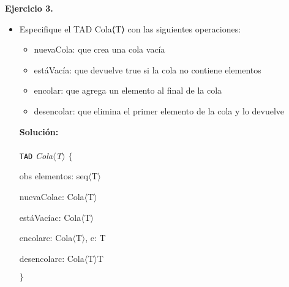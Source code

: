 \documentclass{article}
\newenvironment{tad}[1]{
	\paragraph{} \vspace*{-4mm}
	\newcommand{\obs}[2]{\texttt{obs} ##1 : ##2}

	\vspace{1ex}
	\texttt{TAD} \textit{#1} $\{$
	\par
	\tocarEspacios
}
{

\hspace{2.5mm} $\}$
\vspace{2ex}
}
\begin{document}
\textbf{Ejercicio 3.} 
\begin{itemize}
    \item [a)] Especifique el TAD Cola⟨T⟩ con las siguientes operaciones:
    \begin{itemize}
        \item [a)] nuevaCola: que crea una cola vac\'ia
        \item [b)] est\'aVac\'ia: que devuelve true si la cola no contiene elementos
        \item [c)] encolar: que agrega un elemento al final de la cola
        \item [d)] desencolar: que elimina el primer elemento de la cola y lo devuelve
    \end{itemize}
    \textbf{Soluci\'on:}
    \begin{tad}{Cola$\langle$T$\rangle$}
        obs elementos: seq$\langle$T$\rangle$

        \begin{proc}{nuevaCola}{\Inout c: Cola$\langle$T$\rangle$}{}
        \end{proc}

        \begin{proc}{est\'aVac\'ia}{\In c: Cola$\langle$T$\rangle$}{\bool}
        \end{proc}

        \begin{proc}{encolar}{\Inout c: Cola$\langle$T$\rangle$, \In e: T}{}
        \end{proc}

        \begin{proc}{desencolar}{\Inout c: Cola$\langle$T$\rangle$}{T}
        \end{proc}
    \end{tad}
        

\end{itemize}
\end{document}
